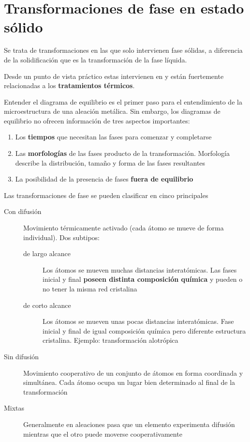 \section{Transformaciones de fase en estado sólido}

Se trata de transformaciones en las que solo intervienen fase sólidas, a diferencia de la solidificación que es la transformación de la fase líquida.


Desde un punto de vista práctico estas intervienen en y están fuertemente relacionadas a los \textbf{tratamientos térmicos}.

Entender el diagrama de equilibrio es el primer paso para el entendimiento de la microestructura de una aleación metálica. Sin embargo, los diagramas de equilibrio no ofrecen información de tres aspectos importantes:

\begin{enumerate}
	\item Los {\bf tiempos} que necesitan las fases para comenzar y completarse
	\item Las {\bf morfologías} de las fases producto de la transformación. Morfología describe la distribución, tamaño y forma de las fases resultantes
	\item La posibilidad de la presencia de fases \textbf{fuera de equilibrio}
\end{enumerate}

Las transformaciones de fase se pueden clasificar en cinco principales

\begin{description}
	\item[Con difusión] Movimiento térmicamente activado (cada átomo se mueve de forma individual). Dos subtipos:
	\begin{description}
		\item[de largo alcance] Los átomos se mueven muchas distancias interatómicas. Las fases inicial y final \textbf{poseen distinta composición química} y pueden o no tener la misma red cristalina
		\item[de corto alcance]  Los átomos se mueven unas pocas distancias interatómicas. Fase inicial y final de igual composición química pero diferente estructura cristalina. Ejemplo: transformación alotrópica
	\end{description} 
	\item[Sin difusión] Movimiento cooperativo de un conjunto de átomos en forma coordinada y simultánea. Cada átomo ocupa un lugar bien determinado al final de la transformación
	\item[Mixtas] Generalmente en aleaciones pasa que un elemento experimenta difusión mientras que el otro puede moverse cooperativamente
\end{description}


